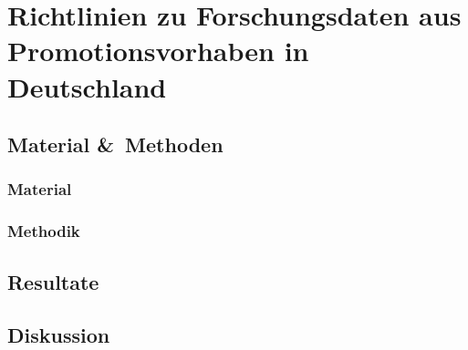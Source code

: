 \chapter{Richtlinien zu Forschungsdaten aus Promotionsvorhaben in Deutschland}\label{ch:richtlinien}

\section{Material \&\ Methoden}

\subsection{Material}

\subsection{Methodik}

\section{Resultate}

\section{Diskussion}
